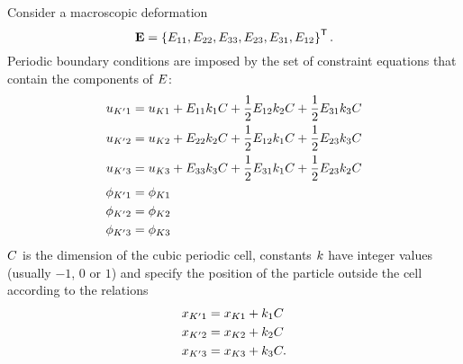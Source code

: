 Consider a macroscopic deformation
\begin{equation}
	\macroscopicDeformationVector = \left\{
		\macroscopicDeformation_{11},
		\macroscopicDeformation_{22},
		\macroscopicDeformation_{33},
		\macroscopicDeformation_{23},
		\macroscopicDeformation_{31},
		\macroscopicDeformation_{12}
	\right\}\T
	.
\end{equation}
Periodic boundary conditions are imposed by the set of constraint equations that contain the components of $E$:
\begin{equation}
	\begin{aligned}
		u_{K'1} &= u_{K1} + E_{11}k_1C + \frac{1}{2}E_{12}k_2C + \frac{1}{2}E_{31}k_3C
		\\
		u_{K'2} &= u_{K2} + E_{22}k_2C + \frac{1}{2}E_{12}k_1C + \frac{1}{2}E_{23}k_3C
		\\
		u_{K'3} &= u_{K3} + E_{33}k_3C + \frac{1}{2}E_{31}k_1C + \frac{1}{2}E_{23}k_2C
		\\
		\phi_{K'1} &= \phi_{K1} \\
		\phi_{K'2} &= \phi_{K2} \\
		\phi_{K'3} &= \phi_{K3} \\
	\end{aligned}
	\label{eqMacroPropertiesElasticFemPeriDspl}
\end{equation}
$C$ is the dimension of the cubic periodic cell, constants $k$ have integer values (usually $-1$, $0$ or $1$) and specify the position of the particle outside the cell according to the relations
\begin{equation}
	\begin{aligned}
		x_{K'1} &= x_{K1} + k_1C
		\\
		x_{K'2} &= x_{K2} + k_2C
		\\
		x_{K'3} &= x_{K3} + k_3C
		.
	\end{aligned}
\end{equation}
